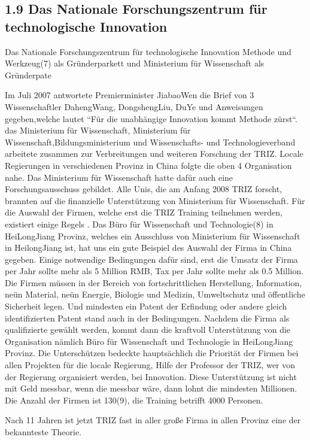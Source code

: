 \documentclass[11pt,a4paper]{article}
\begin{document}
\subsection{1.9 Das Nationale Forschungszentrum für technologische Innovation}

Das Nationale Forschungszentrum für technologische Innovation Methode und
Werkzeug(7) als Gründerparkett und Ministerium für Wissenschaft als
Gründerpate

Im Juli 2007 antwortete Premierminister JiabaoWen die Brief von 3
Wissenschaftler DahengWang, DongshengLiu, DuYe und Anweisungen gegeben,welche
lautet “Für die unabhängige Innovation kommt Methode zürst“.  das Ministerium
für Wissenschaft, Ministerium für Wissenschaft,Bildungsministerium und
Wissenschafts- und Technologieverband arbeitete zusammen zur Verbreitungen und
weiteren Forschung der TRIZ. Locale Regierungen in verschiedenen Provinz in
China folgte die oben 4 Organisation nahe. Das Ministerium für Wissenschaft
hatte dafür auch eine Forschungsausschuss gebildet. Alle Unis, die am Anfang
2008 TRIZ forscht, brannten auf die finanzielle Unterstützung von Ministerium
für Wissenschaft. Für die Auswahl der Firmen, welche erst die TRIZ Training
teilnehmen werden, existiert einige Regels . Das Büro für Wissenschaft und
Technologie(8) in HeiLongJiang Provinz, welches ein Ausschluss von Ministerium
für Wissenschaft in HeilongJiang ist, hat uns ein gute Beispiel des Auswahl
der Firma in China gegeben. Einige notwendige Bedingungen dafür sind, erst die
Umsatz der Firma per Jahr sollte mehr als 5 Million RMB, Tax per Jahr sollte
mehr als 0.5 Million. Die Firmen müssen in der Bereich von fortschrittlichen
Herstellung, Information, neün Material, neün Energie, Biologie und Medizin,
Umweltschutz und öffentliche Sicherheit legen. Und mindesten ein Patent der
Erfindung oder andere gleich identifizierten Patent stand auch in der
Bedingungen. Nachdem die Firma als qualifizierte gewählt werden, kommt dann
die kraftvoll Unterstützung von die Organisation nämlich Büro für Wissenschaft
und Technologie in HeiLongJiang Provinz. Die Unterschützen bedeckte
hauptsächlich die Priorität der Firmen bei allen Projekten für die locale
Regierung, Hilfe der Professor der TRIZ, wer von der Regierung organisiert
werden, bei Innovation. Diese Unterstützung ist nicht mit Geld messbar, wenn
die messbar wäre, dann lohnt die mindesten Millionen. Die Anzahl der Firmen
ist 130(9), die Training betrifft 4000 Personen.

Nach 11 Jahren ist jetzt TRIZ fast in aller große Firma in allen Provinz eine
der bekannteste Theorie.
\end{document}
